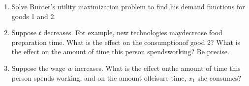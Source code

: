 \documentclass{article}
\begin{document}
\begin{enumerate}
\item Solve Bunter's utility maximization problem to find his demand functions for goods 1 and 2.

\item  Suppose $t$ decreases. For example, new technologies maydecrease food preparation time. What is the effect on the consumptionof good 2? What is the effect on the amount of time this person spendsworking? Be precise.

\item  Suppose the wage $w$ increases. What is the effect onthe amount of time this person spends working, and on the amount ofleisure time, $x_1$ she consumes?
\end{enumerate}
\end{document}
